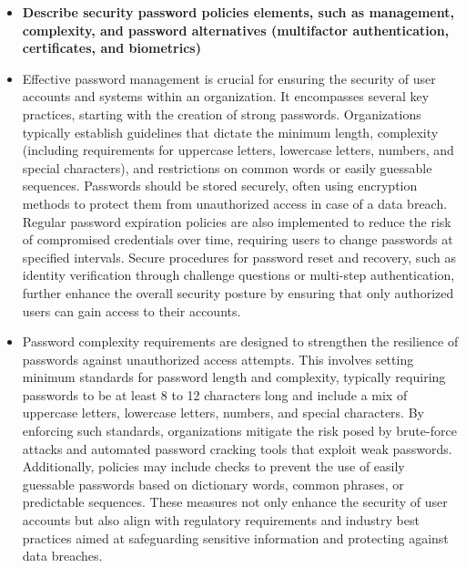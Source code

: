 \documentclass{article}
\begin{document}
\begin{itemize}
  \item \textbf{Describe security password policies elements, such as management, complexity, and password alternatives (multifactor authentication, certificates, and biometrics)}
  	\item[] Effective password management is crucial for ensuring the security of user accounts and systems within an organization. It encompasses several key practices, starting with the creation of strong passwords. Organizations typically establish guidelines that dictate the minimum length, complexity (including requirements for uppercase letters, lowercase letters, numbers, and special characters), and restrictions on common words or easily guessable sequences. Passwords should be stored securely, often using encryption methods to protect them from unauthorized access in case of a data breach. Regular password expiration policies are also implemented to reduce the risk of compromised credentials over time, requiring users to change passwords at specified intervals. Secure procedures for password reset and recovery, such as identity verification through challenge questions or multi-step authentication, further enhance the overall security posture by ensuring that only authorized users can gain access to their accounts.
	\item[] Password complexity requirements are designed to strengthen the resilience of passwords against unauthorized access attempts. This involves setting minimum standards for password length and complexity, typically requiring passwords to be at least 8 to 12 characters long and include a mix of uppercase letters, lowercase letters, numbers, and special characters. By enforcing such standards, organizations mitigate the risk posed by brute-force attacks and automated password cracking tools that exploit weak passwords. Additionally, policies may include checks to prevent the use of easily guessable passwords based on dictionary words, common phrases, or predictable sequences. These measures not only enhance the security of user accounts but also align with regulatory requirements and industry best practices aimed at safeguarding sensitive information and protecting against data breaches.

\end{itemize}
\end{document}
